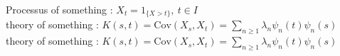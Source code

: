\documentclass[leqno,hyperref={pdfpagemode=FullScreen},
xcolor={dvipsnames,svgnames,table}]{beamer}
\newcommand{\Cov}{\mathrm{Cov}}
\begin{document}
\begin{frame}
\begin{tcolorbox}[tab2,tabularx={X},title=Very Long Développements text ,boxrule=0.9pt, fontupper=\small]
Processus of something : $X_t={1}_{\{X> t\}},\ t\in I$\\\hline\hline
theory of something : ${K(s,t)=\Cov(X_{s},X_{t})=\sum_{n\geq 1}\lambda_{n}\psi_{n}(t)\psi_{n}(s)}$   \\\hline
theory of something : $K(s,t)=\Cov(X_{s},X_{t})=\sum_{n\geq 1}\lambda_{n}\psi_{n}(t)\psi_{n}(s)$   \\ \\\hline{}  \\  \\  \\ \\\hline
\end{tcolorbox}
\end{frame}
\end{document}
